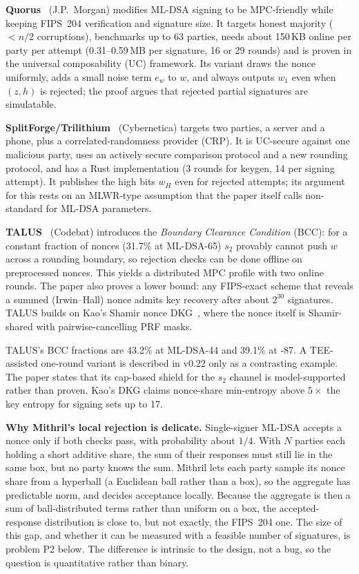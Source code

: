 \documentclass[10pt,conference,a4paper]{IEEEtran}
\begin{document}
\textbf{Quorus}~\cite{quorus} (J.P.\ Morgan) modifies ML-DSA signing to be MPC-friendly while keeping FIPS~204
verification and signature size. It targets honest majority ($<n/2$ corruptions), benchmarks up to 63 parties, needs
about 150\,KB online per party per attempt (0.31--0.59\,MB per signature, 16 or 29 rounds) and is proven in the universal
composability (UC) framework. Its variant draws the nonce uniformly, adds a small noise term $e_w$ to $w$, and always
outputs $w_1$ even when $(z,h)$ is rejected; the proof argues that rejected partial signatures are simulatable.

\textbf{SplitForge/Trilithium}~\cite{trilithium} (Cybernetica) targets two parties, a server and a phone, plus a
correlated-randomness provider (CRP). It is UC-secure against one malicious party, uses an actively secure comparison
protocol and a new rounding protocol, and has a Rust implementation (3 rounds for keygen, 14 per signing attempt). It
publishes the high bits $w_H$ even for rejected attempts; its argument for this rests on an MLWR-type assumption that the
paper itself calls non-standard for ML-DSA parameters.

\textbf{TALUS}~\cite{talus,taluspw} (Codebat) introduces the \emph{Boundary Clearance Condition} (BCC): for a constant
fraction of nonces (31.7\% at ML-DSA-65) $s_2$ provably cannot push $w$ across a rounding boundary, so rejection checks
can be done offline on preprocessed nonces. This yields a distributed MPC profile with two online rounds. The paper
also proves a lower bound: any FIPS-exact scheme that reveals a summed (Irwin--Hall) nonce admits key recovery after
about $2^{30}$ signatures. TALUS builds on Kao's Shamir nonce DKG~\cite{kao}, where the nonce itself is Shamir-shared
with pairwise-cancelling PRF masks.

TALUS's BCC fractions are 43.2\% at ML-DSA-44 and 39.1\% at -87. A TEE-assisted one-round variant is described in
v0.22 only as a contrasting example. The paper states that its cap-based shield for the $s_2$ channel is
model-supported rather than proven. Kao's DKG claims nonce-share min-entropy above $5\times$ the key entropy for signing
sets up to 17.

\textbf{Why Mithril's local rejection is delicate.} Single-signer ML-DSA accepts a nonce only if both checks pass, with
probability about $1/4$. With $N$ parties each holding a short additive share, the sum of their responses must still lie
in the same box, but no party knows the sum. Mithril lets each party sample its nonce share from a hyperball (a
Euclidean ball rather than a box), so the aggregate has predictable norm, and decides acceptance locally. Because the
aggregate is then a sum of ball-distributed terms rather than uniform on a box, the accepted-response distribution is
close to, but not exactly, the FIPS~204 one. The size of this gap, and whether it can be measured with a feasible number
of signatures, is problem P2 below. The difference is intrinsic to the design, not a bug, so the question is
quantitative rather than binary.
\end{document}
